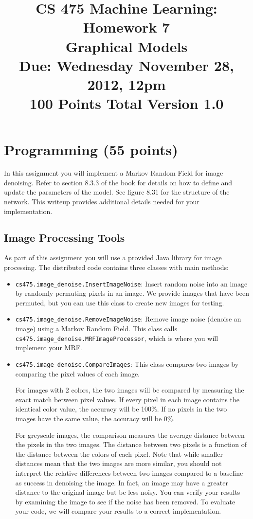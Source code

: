 \documentclass[11pt]{article}
\title{CS 475 Machine Learning: Homework 7\\Graphical Models \\
\Large{Due: Wednesday November 28, 2012, 12pm}\\
100 Points Total \hspace{1cm} Version 1.0}
\author{}
\date{}
\newcommand{\code}[1]{{\footnotesize \tt #1}}
\begin{document}
\large
\maketitle
\thispagestyle{headings}

\vspace{-.5in}

\section{Programming (55 points)}
In this assignment you will implement a Markov Random Field for image denoising. Refer to section 8.3.3 of the book for details on how to define and update the parameters of the model. See figure 8.31 for the structure of the network. This writeup provides additional details needed for your implementation.

\subsection{Image Processing Tools}
As part of this assignment you will use a provided Java library for image processing. The distributed code contains three classes with main methods:
\begin{itemize}
\item \code{cs475.image\_denoise.InsertImageNoise}: Insert random noise into an image by randomly permuting pixels in an image. We provide images that have been permuted, but you can use this class to create new images for testing.
\item \code{cs475.image\_denoise.RemoveImageNoise}: Remove image noise (denoise an image) using a Markov Random Field. This class calls \code{cs475.image\_denoise.MRFImageProcessor}, which is where you will implement your MRF.
\item \code{cs475.image\_denoise.CompareImages}: This class compares two images by comparing the pixel values of each image.

For images with 2 colors, the two images will be compared by measuring the exact match between pixel values. If every pixel in each image contains the identical color value, the accuracy will be 100\%. If no pixels in the two images have the same value, the accuracy will be 0\%. 

For greyscale images, the comparison measures the average distance between the pixels in the two images. The distance between two pixels is a function of the distance between the colors of each pixel. Note that while smaller distances mean that the two images are more similar, you should not interpret the relative differences between two images compared to a baseline as success in denoising the image. In fact, an image may have a greater distance to the original image but be less noisy. You can verify your results by examining the image to see if the noise has been removed. To evaluate your code, we will compare your results to a correct implementation.
\end{itemize}
\end{document}
